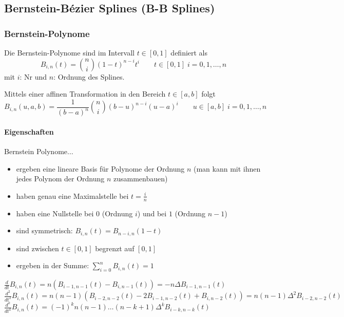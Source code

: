  
\newpage
\subsection{Bernstein-Bézier Splines (B-B Splines)}

\begin{minipage}[c]{15.0cm}	
	\subsubsection{Bernstein-Polynome}\label{sssec:spline_bernsteinpoly}
    	Die Bernstein-Polynome sind im Intervall $t\in[0,1]$ definiert als
	    \[B_{i,n}(t) = \binom{n}{i}(1-t)^{n-i} t^i \qquad t \in [0,1]\; i=0,1,\ldots, n\]
	    mit $i$: Nr und  $n$: Ordnung des Splines.
	    
        Mittels einer affinen Transformation in den Bereich $t \in [a,b]$ folgt	    
	    \[B_{i,n}(u,a,b) =\frac{1}{(b-a)^n}\binom{n}{i}(b-u)^{n-i} (u-a)^i \qquad u \in [a,b]\; i=0,1,\ldots, n\]
	    
	\paragraph{Eigenschaften}
		Bernstein Polynome$\ldots$
	    \begin{itemize}
	      \item ergeben eine lineare Basis für Polynome der Ordnung $n$ (man kann mit ihnen jedes Polynom der Ordnung $n$ zusammenbauen)
	      \item haben genau eine Maximalstelle bei $t=\frac in$
	      \item haben eine Nullstelle bei $0$ (Ordnung $i$) und bei $1$ (Ordnung $n-1$)
	      \item sind symmetrisch: $B_{i,n}(t) = B_{n-i,n}(1-t)$
	      \item sind zwischen $t \in [0,1]$ begrenzt auf $[0,1]$
	      \item ergeben in der Summe: $\sum \limits_{i=0}^n B_{i,n}(t)=1$
	    \end{itemize}
	    
	    $\frac{d}{dt} B_{i,n}(t) = n(B_{i-1,n-1}(t) - B_{i,n-1}(t)) = -n \Delta B_{i-1,n-1}(t)$\\
	    $\frac{d^2}{dt^2} B_{i,n}(t) = n(n-1)(B_{i-2,n-2}(t) -2 B_{i-1,n-2}(t) + B_{i,n-2}(t)) = n(n-1) \Delta^2 B_{i-2,n-2}(t)$\\
	    $\frac{d^k}{dt^k} B_{i,n}(t) = (-1)^k n(n-1)\ldots(n-k+1) \Delta^k B_{i-k,n-k}(t)$
\end{minipage}
